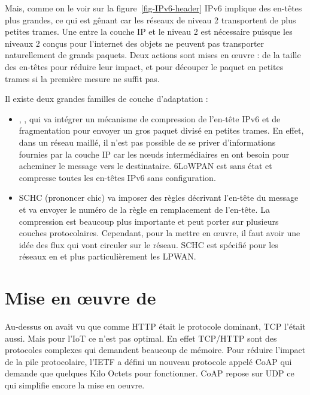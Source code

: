   
  
  
  
  
  Mais, comme on le voir sur la figure~\vref{fig-IPv6-header} \ac{IPv6} implique des en-têtes plus grandes, ce qui est gênant car les réseaux de niveau 2 transportent de plus petites trames.
  Une  entre la couche \ac{IP} et le niveau 2 est nécessaire puisque les niveaux 2 conçus pour l'internet des objets ne peuvent pas transporter naturellement de grands paquets. Deux actions sont mises en œuvre :  de la taille des en-têtes pour réduire leur impact, et  pour découper le paquet en petites trames si la première mesure ne suffit pas. 


     \vspace{1em}

Il existe deux grandes familles de couche d'adaptation :

\begin{itemize}
 \item {} , , qui va intégrer un mécanisme de compression de l'en-tête \ac{IPv6} et de fragmentation pour envoyer un gros paquet divisé en petites trames. En effet, dans un réseau maillé, il n'est pas possible de se priver d'informations fournies par la couche \ac{IP} car les nœuds intermédiaires en ont besoin pour acheminer le message vers le destinataire. 
6LoWPAN est sans état et compresse toutes les en-têtes IPv6 sans configuration. 
\item \ac{SCHC} (prononcer chic)  va imposer des règles décrivant l'en-tête du message et va envoyer le numéro de la règle en remplacement de l'en-tête. La compression est beaucoup plus importante et peut porter sur plusieurs couches protocolaires. Cependant, pour la mettre en œuvre, il faut avoir une idée des flux qui vont circuler sur le réseau. \ac{SCHC} est spécifié pour les réseaux en  et plus particulièrement les \ac{LPWAN}.

\end{itemize}

\section{Mise en \oe{}uvre de }
  
  Au-dessus on avait vu que comme \ac{HTTP} était le protocole dominant, \ac{TCP} l'était aussi. Mais pour l'IoT ce n'est pas optimal. En effet TCP/HTTP sont des protocoles complexes qui demandent beaucoup de mémoire. Pour réduire l'impact de la pile protocolaire, l'\ac{IETF} a défini un nouveau protocole appelé \ac{CoAP} qui demande que quelques Kilo Octets pour fonctionner. \ac{CoAP} repose sur \ac{UDP} ce qui simplifie encore la mise en oeuvre. 
  
